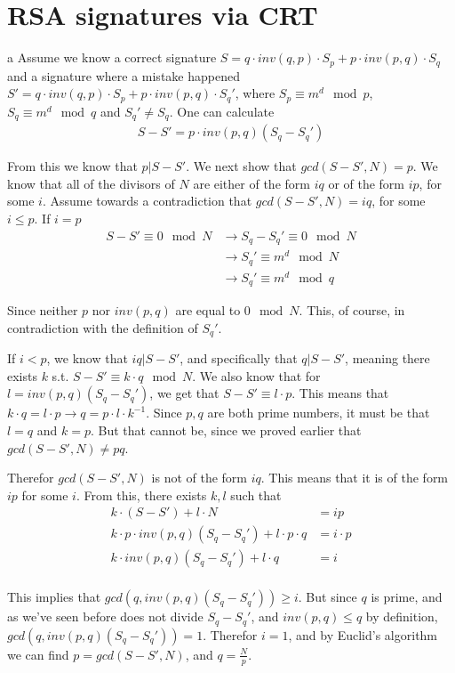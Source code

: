 \documentclass{article}
\begin{document}
\section{RSA signatures via CRT}
\begin{paragraph}
    a Assume we know a correct signature \(S = q \cdot inv(q, p) \cdot S_p + p \cdot inv(p, q) \cdot S_q\) and a signature where a mistake happened \(S' = q \cdot inv(q, p) \cdot S_p + p \cdot inv(p, q) \cdot S_q'\), where \(S_p \equiv m^d \mod{p}\), \(S_q \equiv m^d \mod{q}\) and \(S_q' \neq S_q\). One can calculate
    \begin{align*}
        S - S' = p \cdot inv(p, q) (S_q - S_q')
    \end{align*}
    
    From this we know that \(p|S - S'\). We next show that \(gcd(S - S', N) = p\).
    We know that all of the divisors of \(N\) are either of the form \(iq\) or of the form \(ip\), for some \(i\). Assume towards a contradiction that \(gcd(S - S', N) = iq\), for some \(i \leq p\). If \(i = p\)
    \begin{align*}
        S - S' \equiv 0 \mod{N} &\rightarrow S_q - S_q' \equiv 0 \mod{N}\\
        &\rightarrow S_q' \equiv m^d \mod{N}\\
        &\rightarrow S_q' \equiv m^d \mod{q}
    \end{align*}
    
    Since neither \(p\) nor \(inv(p, q)\) are equal to \(0 \mod{N}\). This, of course, in contradiction with the definition of \(S_q'\).
    
    If \(i < p\), we know that \(iq|S - S'\), and specifically that \(q|S - S'\), meaning there exists \(k\) s.t. \(S - S' \equiv k \cdot q \mod{N}\). We also know that for \(l = inv(p, q) (S_q - S_q')\), we get that \(S - S' \equiv l \cdot p\). This means that \(k \cdot q = l \cdot p \rightarrow q = p \cdot l \cdot k^{-1}\). Since \(p, q\) are both prime numbers, it must be that \(l = q\) and \(k = p\). But that cannot be, since we proved earlier that \(gcd(S - S', N) \neq pq\).
    
    Therefor \(gcd(S - S', N)\) is not of the form \(iq\). This means that it is of the form \(ip\) for some \(i\). From this, there exists \(k, l\) such that
    \begin{align*}
        k \cdot (S - S') + l \cdot N &= ip\\
        k \cdot p \cdot inv(p, q) (S_q - S_q') + l \cdot p \cdot q &= i \cdot p\\
        k \cdot inv(p, q) (S_q - S_q') + l \cdot q &= i\\
    \end{align*}
    
    This implies that \(gcd(q, inv(p, q) (S_q - S_q')) \geq i\). But since \(q\) is prime, and as we've seen before does not divide \(S_q - S_q'\), and \(inv(p, q) \leq q\) by definition, \(gcd(q, inv(p, q) (S_q - S_q')) = 1\). Therefor \(i = 1\), and by Euclid's algorithm we can find \(p = gcd(S - S', N)\), and \(q = \frac{N}{p}\).
\end{paragraph}
\end{document}
